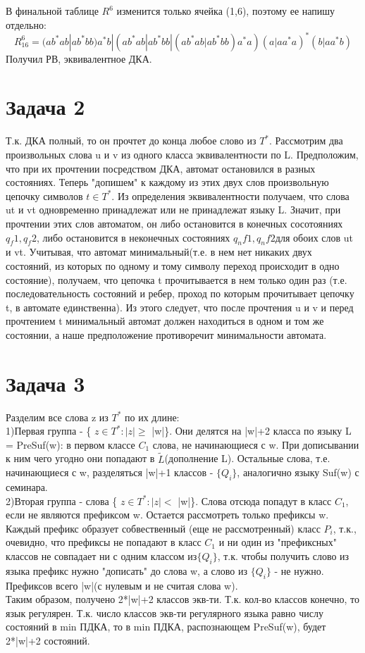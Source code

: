 \documentclass[a4paper,12pt]{article} %
\begin{document}
В финальной таблице $R^6$ изменится только ячейка (1,6), поэтому ее напишу отдельно:\\
\[
R^6_{16}=(ab^*ab|ab^*bb)a^*b|(
ab^*ab|ab^*bb|(ab^*ab|ab^*bb)a^*a)
(a|aa^*a)^*(b|aa^*b)
\]
Получил РВ, эквивалентное ДКА.\\

\section*{Задача 2}

Т.к. ДКА полный, то он прочтет до конца любое слово из $T^*$.
Рассмотрим два произвольных слова u и v из одного класса эквивалентности по L. Предположим, что при их прочтении посредством ДКА, автомат остановился в разных состояниях. Теперь "допишем"
к каждому из этих двух слов произвольную цепочку символов $t \in T^*$. Из определения эквивалентности получаем, что слова ut и vt одновременно принадлежат или не принадлежат языку L. Значит, при прочтении этих слов автоматом, он либо остановится в конечных сосотояниях $q_f1,q_f2$, либо остановится в неконечных состояниях $q_nf1,q_nf2$для обоих слов ut и vt. Учитывая, что автомат минимальный(т.е. в нем нет никаких двух состояний, из которых по одному и тому символу переход происходит в одно состояние), получаем, что цепочка t прочитывается в нем только один раз (т.е. последовательность состояний и ребер, проход по которым прочитывает цепочку t, в автомате единственна). Из этого следует, что после прочтения u и v и перед прочтением t минимальный автомат должен находиться в одном и том же состоянии, а наше предположение противоречит минимальности автомата.\\



\section*{Задача 3}
Разделим все слова z из $T^*$ 
по их длине:\\
1)Первая группа - \{ $z \in T^*: |z| \geq$ |w|\}. Они делятся на |w|+2 класса по языку L = PreSuf(w): в первом классе $C_1$ слова, не начинающиеся с w. При дописывании к ним чего угодно они попадают в $\tilde{L}$(дополнение L). Остальные слова, т.е. начинающиеся с w, разделяться |w|+1 классов - $\{Q_i\}$, аналогично языку Suf(w) с семинара.\\
2)Вторая группа - слова \{ $z \in T^*: |z| < $ |w|\}. Слова отсюда попадут в класс $C_1$, если не являются префиксом w.  
Остается рассмотреть только префиксы w. Каждый префикс образует собвественный (еще не рассмотренный) класс $P_i$, т.к., очевидно, что префиксы не попадают в класс $C_1$ и ни один из "префиксных" классов не совпадает ни с одним классом из$\{Q_i\}$, т.к. чтобы получить слово из языка префикс нужно "дописать" до слова w, а слово из $\{Q_i\}$ - не нужно. Префиксов всего |w|(с нулевым и не считая слова w).\\
Таким образом, получено 2*|w|+2 классов экв-ти. Т.к. кол-во классов конечно, то язык регулярен. Т.к. число классов экв-ти регулярного языка равно числу состояний в min ПДКА, то в min ПДКА, распознающем PreSuf(w), будет 2*|w|+2 состояний.\\
\end{document}
